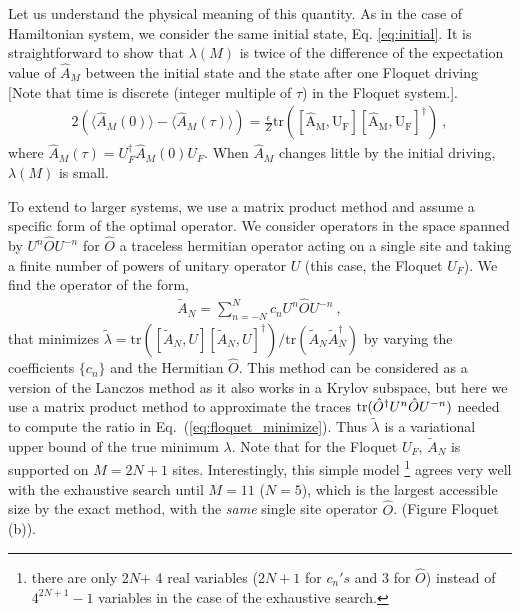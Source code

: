 \documentclass[twocolumn,superscriptaddress, prb]{revtex4-1}
\begin{document}
Let us understand the physical meaning of this quantity.
As in the case of Hamiltonian system, we consider the same initial state, Eq. \eqref{eq:initial}.
It is straightforward to show that $\lambda(M)$ is twice of the
difference of the expectation value of $\hat{A}_M$ between the initial state and the state after one Floquet driving
[Note that time is discrete (integer multiple of $\tau$) in the Floquet system.].
\begin{align}
2\left(\langle \hat{A}_M(0) \rangle - \langle \hat{A}_M(\tau) \rangle \right) = \frac{\epsilon}{Z}\mathrm{tr([\hat{A}_M,U_F][\hat{A}_M,U_F]^\dag)} ~,
\end{align}
where $\hat{A}_M(\tau) = U_F^\dag \hat{A}_M(0) U_F$.
When $\hat{A}_M$ changes little by the initial driving, $\lambda(M)$ is small. %

To extend to larger systems, we use a matrix product method and assume a specific form of the optimal operator. 
We consider operators in the space spanned by $U^n \hat{O} U^{- n}$ for $\hat{O}$ a traceless hermitian operator acting on a single site 
and taking a finite number of powers of unitary operator $U$ (this case, the Floquet $U_F$).
We find the operator of the form,
\begin{align}
 \tilde{A}_N=\sum_{n=-N}^N c_n U^n \hat{O} U^{- n} ~,
 \label{eq:filter}
\end{align}
that minimizes $\tilde{\lambda} = \mathrm{tr}([\tilde{A}_N,U][\tilde{A}_N,U]^\dag)/\mathrm{tr}(\tilde{A}_N\tilde{A}_N^\dag)$ 
by varying the coefficients $\{c_n\}$ and the Hermitian $\hat{O}$. 
This method can be considered as a version of the Lanczos method as it also works in a Krylov subspace, 
but here we use a matrix product method to approximate the traces ${\rm tr}(\hat{O}^\dagger U^n \hat{O} U^{-n})$ needed to compute the ratio in Eq.~(\ref{eq:floquet_minimize}).
Thus $\tilde{\lambda}$ is a variational upper bound of the true minimum $\lambda$. 
Note that for the Floquet $U_F$, $\tilde{A}_N$ is supported on $M = 2N+1$ sites. 
Interestingly, this simple model \footnote{there are only 2$N$+ 4 real variables ($2N+1$ for $c_n's$ and 3 for $\hat{O}$) instead of $4^{2N+1} - 1$ variables 
in the case of the exhaustive search.} 
agrees very well with the exhaustive search until $M = 11$ ($N = 5$), which is the largest accessible size by the exact method, 
with the {\it same} single site operator $\hat{O}$.  
(Figure Floquet (b)).      
\end{document}
